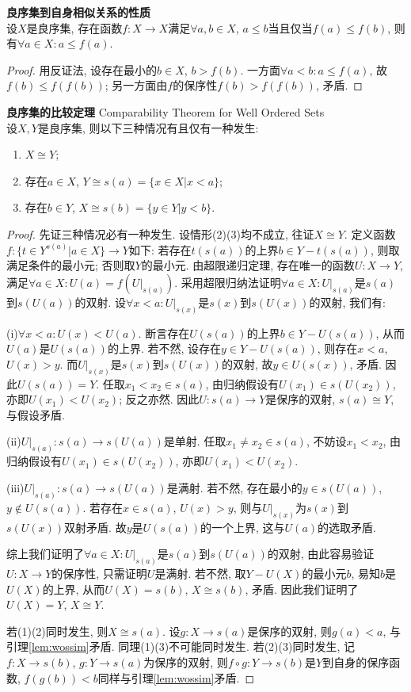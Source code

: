 \begin{lem}\textbf{良序集到自身相似关系的性质}\\
设$X$是良序集, 存在函数$f:X\to X$满足$\forall a,b\in X$, $a\le b$当且仅当$f(a)\le f(b)$, 则有$\forall a\in X: a\le f(a)$. 
\label{lem:wossim}
\end{lem}
\begin{proof}
用反证法, 设存在最小的$b\in X$, $b>f(b)$. 一方面$\forall a<b: a\le f(a)$, 故$f(b)\le f(f(b))$; 另一方面由$f$的保序性$f(b)>f(f(b))$, 矛盾. 
\end{proof}

\begin{pro}\textbf{良序集的比较定理} Comparability Theorem for Well Ordered Sets\\
设$X,Y$是良序集, 则以下三种情况有且仅有一种发生: 
\begin{enumerate}
    \item $X \cong Y$;
    \item 存在$a\in X$, $Y\cong s(a)=\{x\in X\vert x<a\}$;
    \item 存在$b\in Y$, $X\cong s(b)=\{y\in Y\vert y<b\}$.
\end{enumerate}
\label{thm:woscomp}
\end{pro}
\begin{proof}
先证三种情况必有一种发生. 设情形(2)(3)均不成立, 往证$X\cong Y$. 定义函数$f:\{t\in Y^{s(a)}\vert a\in X\}\to Y$如下: 若存在$t(s(a))$的上界$b\in Y-t(s(a))$, 则取满足条件的最小元; 否则取$Y$的最小元. 由超限递归定理, 存在唯一的函数$U: X\to Y$, 满足$\forall a\in X: U(a)=f(U|_{s(a)})$. 采用超限归纳法证明$\forall a\in X: U|_{s(a)}$是$s(a)$到$s(U(a))$的双射. 设$\forall x<a: U|_{s(x)}$是$s(x)$到$s(U(x))$的双射, 我们有: \par (i)$\forall x<a: U(x)<U(a)$. 断言存在$U(s(a))$的上界$b\in Y-U(s(a))$, 从而$U(a)$是$U(s(a))$的上界. 若不然, 设存在$y\in Y-U(s(a))$, 则存在$x<a$, $U(x)>y$. 而$U|_{s(x)}$是$s(x)$到$s(U(x))$的双射, 故$y\in U(s(x))$, 矛盾. 因此$U(s(a))=Y$. 任取$x_1<x_2\in s(a)$, 由归纳假设有$U(x_1)\in s(U(x_2))$, 亦即$U(x_1)<U(x_2)$; 反之亦然. 因此$U: s(a)\to Y$是保序的双射, $s(a)\cong Y$, 与假设矛盾. 
\par (ii)$U|_{s(a)}: s(a)\to s(U(a))$是单射. 任取$x_1\neq x_2\in s(a)$, 不妨设$x_1<x_2$, 由归纳假设有$U(x_1)\in s(U(x_2))$, 亦即$U(x_1)<U(x_2)$. 
\par (iii)$U|_{s(a)}: s(a)\to s(U(a))$是满射. 若不然, 存在最小的$y\in s(U(a))$, $y\notin U(s(a))$. 若存在$x\in s(a)$, $U(x)>y$, 则与$U|_{s(x)}$为$s(x)$到$s(U(x))$双射矛盾. 故$y$是$U(s(a))$的一个上界, 这与$U(a)$的选取矛盾. 
\par 综上我们证明了$\forall a\in X: U|_{s(a)}$是$s(a)$到$s(U(a))$的双射, 由此容易验证$U:X\to Y$的保序性, 只需证明$U$是满射. 若不然, 取$Y-U(X)$的最小元$b$, 易知$b$是$U(X)$的上界, 从而$U(X)=s(b)$, $X\cong s(b)$, 矛盾. 因此我们证明了$U(X)=Y$, $X\cong Y$. 
\par 若(1)(2)同时发生, 则$X\cong s(a)$. 设$g: X\to s(a)$是保序的双射, 则$g(a)<a$, 与引理\ref{lem:wossim}矛盾. 同理(1)(3)不可能同时发生. 若(2)(3)同时发生, 记$f:X\to s(b)$, $g: Y\to s(a)$为保序的双射, 则$f\circ g: Y \to s(b)$是$Y$到自身的保序函数, $f(g(b))<b$同样与引理\ref{lem:wossim}矛盾.
\end{proof}

